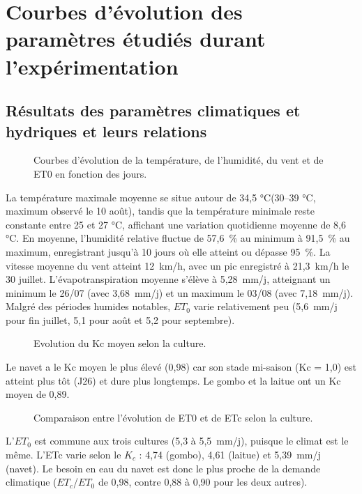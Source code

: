 \section{Courbes d'évolution des paramètres étudiés durant l'expérimentation}
\subsection{Résultats des paramètres climatiques et hydriques et leurs relations}

\begin{figure}[H]
    \centering
    \caption{Courbes d'évolution de la température, de l’humidité, du vent et de ET0 en fonction des jours. }
    \label{fig:H_T_vent_}
\end{figure}

La température maximale moyenne se situe autour de 34,5 °C(30--39 °C, maximum observé le 10 août), tandis que la température minimale reste constante entre 25 et 27 °C, affichant une variation quotidienne moyenne de 8,6 °C. En moyenne, l'humidité relative fluctue de 57,6~\% au minimum à 91,5~\% au maximum, enregistrant jusqu'à 10 jours où elle atteint ou dépasse 95~\%. La vitesse moyenne du vent atteint 12~km/h, avec un pic enregistré à 21,3~km/h le 30 juillet. L'évapotranspiration moyenne s'élève à 5,28~mm/j, atteignant un minimum le 26/07 (avec 3,68~mm/j) et un maximum le 03/08 (avec 7,18~mm/j). Malgré des périodes humides notables, $ET_0$ varie relativement peu (5,6~mm/j pour fin juillet, 5,1 pour août et 5,2 pour septembre).

\begin{figure}[H]
    \centering
    \caption{Evolution du Kc moyen selon la culture. }
    \label{fig:Kc_moyen5}
\end{figure}
Le navet a le Kc moyen le plus élevé (0,98) car son stade mi-saison (Kc = 1,0) est atteint plus tôt (J26) et dure plus longtemps. Le gombo et la laitue ont un Kc moyen de 0,89.

\begin{figure}[H]
    \centering
    \caption{Comparaison entre l'évolution de ET0 et de ETc selon la culture. }
    \label{fig:eto-etc-moyen5}
\end{figure}
 L’$ET_0$ est commune aux trois cultures (5,3 à 5,5~mm/j), puisque le climat est le même. L'ETc varie selon le $K_c$ : 4,74 (gombo), 4,61 (laitue) et 5,39~mm/j (navet). Le besoin en eau du navet est donc le plus proche de la demande climatique ($ET_c$/$ET_0$ de 0,98, contre 0,88 à 0,90 pour les deux autres).

